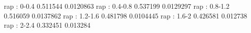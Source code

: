 rap : 0-0.4
0.511544 0.0120863
rap : 0.4-0.8
0.537199 0.0129297
rap : 0.8-1.2
0.516059 0.0137862
rap : 1.2-1.6
0.481798 0.0104445
rap : 1.6-2
0.426581 0.012738
rap : 2-2.4
0.332451 0.013284
